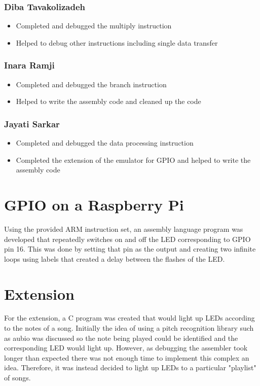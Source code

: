 \documentclass[11pt]{article}
\begin{document}
\subsubsection{Diba Tavakolizadeh}
\begin{itemize}
\item Completed and debugged the multiply instruction
\item Helped to debug other instructions including single data transfer
\end{itemize}

\subsubsection{Inara Ramji}
\begin{itemize}
\item Completed and debugged the branch instruction
\item Helped to write the assembly code and cleaned up the code
\end{itemize}

\subsubsection{Jayati Sarkar}
\begin{itemize}
\item Completed and debugged the data processing instruction
\item Completed the extension of the emulator for GPIO and helped to write the assembly code
\end{itemize}

\section{GPIO on a Raspberry Pi}

Using the provided ARM instruction set, an assembly language program was developed that repeatedly switches on and off the LED corresponding to GPIO pin 16. This was done by setting that pin as the output and creating two infinite loops using labels that created a delay between the flashes of the LED.

\section{Extension}

For the extension, a C program was created that would light up LEDs according to the notes of a song. Initially the idea of using a pitch recognition library such as aubio was discussed so the note being played could be identified and the corresponding LED would light up. However, as debugging the assembler took longer than expected there was not enough time to implement this complex an idea. Therefore, it was instead decided to light up LEDs to a particular "playlist" of songs.
\end{document}
